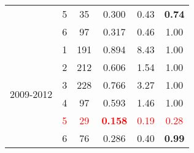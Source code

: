 \begin{table}
\begin{tabular}{rrcrrr}
    \multicolumn{1}{c}{} & \multicolumn{1}{c}{5} & \multicolumn{1}{c}{35} & \multicolumn{1}{c}{0.300 } & \multicolumn{1}{r}{0.43 } & \multicolumn{1}{c}{\textbf{0.74}} \\
    \multicolumn{1}{c}{} & \multicolumn{1}{c}{6} & \multicolumn{1}{c}{97} & \multicolumn{1}{c}{0.317} & \multicolumn{1}{r}{0.46 } & \multicolumn{1}{c}{1.00 } \\\midrule
    \multicolumn{1}{c}{\multirow{6}[2]{*}{\begin{sideways}2009-2012\end{sideways}}} & \multicolumn{1}{c}{1} & \multicolumn{1}{c}{191} & \multicolumn{1}{c}{0.894 } & \multicolumn{1}{r}{8.43 } & \multicolumn{1}{c}{1.00 } \\
    \multicolumn{1}{c}{} & \multicolumn{1}{c}{2} & \multicolumn{1}{c}{212} & \multicolumn{1}{c}{0.606 } & \multicolumn{1}{r}{1.54 } & \multicolumn{1}{c}{1.00 } \\
    \multicolumn{1}{c}{} & \multicolumn{1}{c}{3} & \multicolumn{1}{c}{228} & \multicolumn{1}{c}{0.766 } & \multicolumn{1}{r}{3.27 } & \multicolumn{1}{c}{1.00 } \\
    \multicolumn{1}{c}{} & \multicolumn{1}{c}{4} & \multicolumn{1}{c}{97} & \multicolumn{1}{c}{0.593 } & \multicolumn{1}{r}{1.46 } & \multicolumn{1}{c}{1.00 } \\
    \multicolumn{1}{c}{} & \multicolumn{1}{c}{\textcolor{red}{5}} & \multicolumn{1}{c}{\textcolor{red}{29}} & \multicolumn{1}{c}{\textcolor{red}{\textbf{0.158 }}} & \multicolumn{1}{r}{\textcolor{red}{0.19}} & \multicolumn{1}{c}{\textcolor{red}{0.28}} \\
    \multicolumn{1}{c}{} & \multicolumn{1}{c}{6} & \multicolumn{1}{c}{76} & \multicolumn{1}{c}{0.286} & \multicolumn{1}{r}{0.40 } & \multicolumn{1}{c}{\textbf{0.99}} \\
    \bottomrule
    \end{tabular}%
  \label{tab:pHSWPHPA}%
\end{table}%
